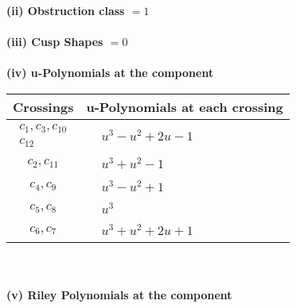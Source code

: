 \documentclass[1p]{elsarticle_modified}
\theoremstyle{definition}
\begin{document}
\flushleft \textbf{(ii) Obstruction class $= 1$}\\~\\
\flushleft \textbf{(iii) Cusp Shapes $= 0$}\\~\\
\newpage\renewcommand{\arraystretch}{1}
\flushleft \textbf{(iv) u-Polynomials at the component}\newline \\
\begin{tabular}{m{50pt}|m{274pt}}
Crossings & \hspace{64pt}u-Polynomials at each crossing \\
\hline $$\begin{aligned}c_{1},c_{3},c_{10}\\c_{12}\end{aligned}$$&$\begin{aligned}
&u^3- u^2+2 u-1
\end{aligned}$\\
\hline $$\begin{aligned}c_{2},c_{11}\end{aligned}$$&$\begin{aligned}
&u^3+u^2-1
\end{aligned}$\\
\hline $$\begin{aligned}c_{4},c_{9}\end{aligned}$$&$\begin{aligned}
&u^3- u^2+1
\end{aligned}$\\
\hline $$\begin{aligned}c_{5},c_{8}\end{aligned}$$&$\begin{aligned}
&u^3
\end{aligned}$\\
\hline $$\begin{aligned}c_{6},c_{7}\end{aligned}$$&$\begin{aligned}
&u^3+u^2+2 u+1
\end{aligned}$\\
\hline
\end{tabular}\\~\\
\newpage\renewcommand{\arraystretch}{1}
\flushleft \textbf{(v) Riley Polynomials at the component}\newline \\
\end{document}

